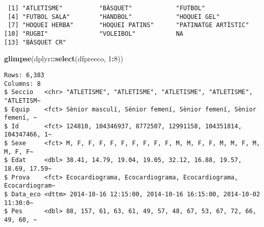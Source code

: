 \documentclass[
]{book}
\newenvironment{Shaded}{\begin{snugshade}}{\end{snugshade}}
\newcommand{\AttributeTok}[1]{\textcolor[rgb]{0.13,0.29,0.53}{#1}}
\newcommand{\ConstantTok}[1]{\textcolor[rgb]{0.56,0.35,0.01}{#1}}
\newcommand{\DecValTok}[1]{\textcolor[rgb]{0.00,0.00,0.81}{#1}}
\newcommand{\FunctionTok}[1]{\textcolor[rgb]{0.13,0.29,0.53}{\textbf{#1}}}
\newcommand{\NormalTok}[1]{#1}
\newcommand{\OtherTok}[1]{\textcolor[rgb]{0.56,0.35,0.01}{#1}}
\newcommand{\SpecialCharTok}[1]{\textcolor[rgb]{0.81,0.36,0.00}{\textbf{#1}}}
\newcommand{\StringTok}[1]{\textcolor[rgb]{0.31,0.60,0.02}{#1}}
\theoremstyle{definition}
\theoremstyle{definition}
\theoremstyle{definition}
\theoremstyle{definition}
\theoremstyle{remark}
\begin{document}
\begin{Shaded}
\end{Shaded}

\begin{verbatim}
 [1] "ATLETISME"          "BÀSQUET"            "FUTBOL"            
 [4] "FUTBOL SALA"        "HANDBOL"            "HOQUEI GEL"        
 [7] "HOQUEI HERBA"       "HOQUEI PATINS"      "PATINATGE ARTÍSTIC"
[10] "RUGBI"              "VOLEIBOL"           NA                  
[13] "BÀSQUET CR"        
\end{verbatim}

\begin{Shaded}
\begin{Highlighting}[]
\FunctionTok{glimpse}\NormalTok{(dplyr}\SpecialCharTok{::}\FunctionTok{select}\NormalTok{(dfpreeco, }\DecValTok{1}\SpecialCharTok{:}\DecValTok{8}\NormalTok{))}
\end{Highlighting}
\end{Shaded}

\begin{verbatim}
Rows: 6,383
Columns: 8
$ Seccio   <chr> "ATLETISME", "ATLETISME", "ATLETISME", "ATLETISME", "ATLETISM~
$ Equip    <fct> Sènior masculí, Sènior femení, Sènior femení, Sènior femení, ~
$ Id       <fct> 124810, 104346937, 8772507, 12991158, 104351814, 104347466, 1~
$ Sexe     <fct> M, F, F, F, F, F, F, F, F, F, M, M, F, F, M, M, F, M, M, F, F~
$ Edat     <dbl> 38.41, 14.79, 19.04, 19.05, 32.12, 16.88, 19.57, 18.69, 17.59~
$ Prova    <fct> Ecocardiograma, Ecocardiograma, Ecocardiograma, Ecocardiogram~
$ Data_eco <dttm> 2014-10-16 12:15:00, 2014-10-16 16:15:00, 2014-10-02 11:30:0~
$ Pes      <dbl> 88, 157, 61, 63, 61, 49, 57, 48, 67, 53, 67, 72, 66, 49, 60, ~
\end{verbatim}
\end{document}
